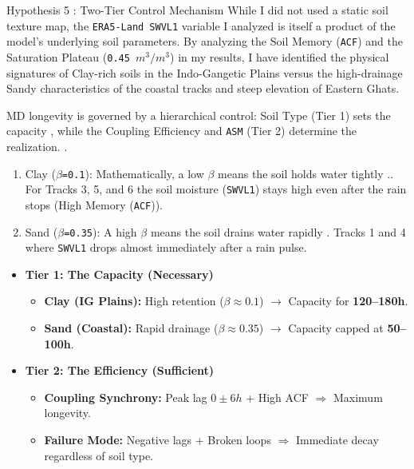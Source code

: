 \documentclass[8pt, aspectratio=169]{beamer}
\begin{document}
\begin{frame}{Hypothesis 5 : Two-Tier Control Mechanism}
    \vspace{0.2cm}
    \tiny
    While I did not used a static soil texture map, the \texttt{ERA5-Land SWVL1} variable I analyzed is itself a product of the model's underlying soil parameters. By analyzing the Soil Memory (\texttt{ACF}) and the Saturation Plateau (\texttt{0.45 $m^3/m^3$}) in my results, I have identified the physical signatures of Clay-rich soils in the Indo-Gangetic Plains versus the high-drainage Sandy characteristics of the coastal tracks and steep elevation of Eastern Ghats.

    \vspace{0.05cm}
    \begin{block}{\footnotesize MD longevity is governed by a hierarchical control: Soil Type (Tier 1) sets the capacity \cite{seneviratne2010investigating}, while the Coupling Efficiency and \texttt{ASM} (Tier 2) determine the realization. \cite{hunt2017effect} \cite{kishtawal2013enhancement}.}\end{block}

    \vspace{0.05cm}
    \begin{enumerate}
        \item Clay (\texttt{$\beta$=0.1}): Mathematically, a low $\beta$ means the soil holds water tightly \cite{clapp1978empirical}.. For Tracks 3, 5, and 6 the soil moisture (\texttt{SWVL1}) stays high even after the rain stops (High Memory (\texttt{ACF})).
        \item Sand (\texttt{$\beta$=0.35}): A high $\beta$ means the soil drains water rapidly \cite{seneviratne2010investigating}. Tracks 1 and 4 where \texttt{SWVL1} drops almost immediately after a rain pulse.
    \end{enumerate}

    \vspace{0.1cm}
    \footnotesize
    \begin{itemize}
        \item \textbf{Tier 1: The Capacity (Necessary)}  
            \begin{itemize} \footnotesize
                \item \textbf{Clay (IG Plains):} High retention ($\beta \approx 0.1$) $\rightarrow$ Capacity for \textbf{120--180h}.
                \item \textbf{Sand (Coastal):} Rapid drainage ($\beta \approx 0.35$) $\rightarrow$ Capacity capped at \textbf{50--100h}.
            \end{itemize}
        \item \textbf{Tier 2: The Efficiency (Sufficient)} 
            \begin{itemize} \footnotesize
                \item \textbf{Coupling Synchrony:} Peak lag $0 \pm 6h$ + High ACF $\Rightarrow$ Maximum longevity.
                \item \textbf{Failure Mode:} Negative lags + Broken loops $\Rightarrow$ Immediate decay regardless of soil type.
            \end{itemize}
    \end{itemize}


\end{frame}
\end{document}
